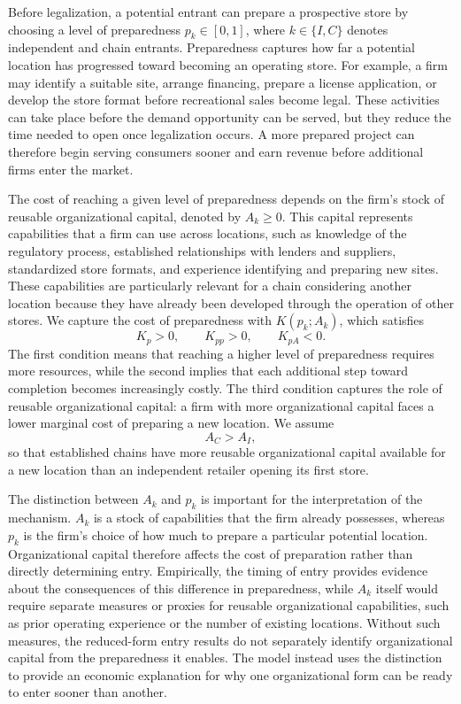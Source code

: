 \documentclass[english,12pt]{article}
\begin{document}
Before legalization, a potential entrant can prepare a prospective store by choosing a level of preparedness $p_k\in[0,1]$, where $k\in\{I,C\}$ denotes independent and chain entrants. Preparedness captures how far a potential location has progressed toward becoming an operating store. For example, a firm may identify a suitable site, arrange financing, prepare a license application, or develop the store format before recreational sales become legal. These activities can take place before the demand opportunity can be served, but they reduce the time needed to open once legalization occurs. A more prepared project can therefore begin serving consumers sooner and earn revenue before additional firms enter the market.

The cost of reaching a given level of preparedness depends on the firm's stock of reusable organizational capital, denoted by $A_k\geq0$. This capital represents capabilities that a firm can use across locations, such as knowledge of the regulatory process, established relationships with lenders and suppliers, standardized store formats, and experience identifying and preparing new sites. These capabilities are particularly relevant for a chain considering another location because they have already been developed through the operation of other stores. We capture the cost of preparedness with $K(p_k;A_k)$, which satisfies
\[
K_p>0,
\qquad
K_{pp}>0,
\qquad
K_{pA}<0.
\]
The first condition means that reaching a higher level of preparedness requires more resources, while the second implies that each additional step toward completion becomes increasingly costly. The third condition captures the role of reusable organizational capital: a firm with more organizational capital faces a lower marginal cost of preparing a new location. We assume
\[
A_C>A_I,
\]
so that established chains have more reusable organizational capital available for a new location than an independent retailer opening its first store.

The distinction between $A_k$ and $p_k$ is important for the interpretation of the mechanism. $A_k$ is a stock of capabilities that the firm already possesses, whereas $p_k$ is the firm's choice of how much to prepare a particular potential location. Organizational capital therefore affects the cost of preparation rather than directly determining entry. Empirically, the timing of entry provides evidence about the consequences of this difference in preparedness, while $A_k$ itself would require separate measures or proxies for reusable organizational capabilities, such as prior operating experience or the number of existing locations. Without such measures, the reduced-form entry results do not separately identify organizational capital from the preparedness it enables. The model instead uses the distinction to provide an economic explanation for why one organizational form can be ready to enter sooner than another.
\end{document}
